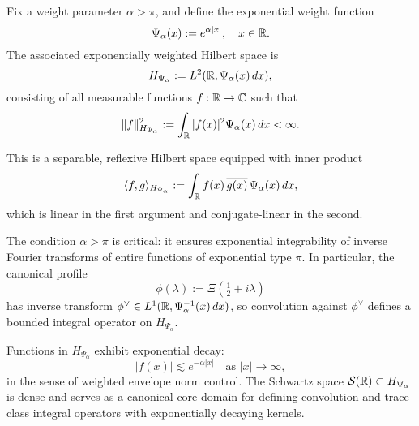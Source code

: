 \begin{definition}
\label{def:weighted_fourier_space}
Fix a weight parameter \( \alpha > \pi \), and define the exponential weight function
\[
\Psi_\alpha(x) := e^{\alpha |x|}, \quad x \in \mathbb{R}.
\]
The associated exponentially weighted Hilbert space is
\[
H_{\Psi_\alpha} := L^2(\mathbb{R}, \Psi_\alpha(x)\, dx),
\]
consisting of all measurable functions \( f : \mathbb{R} \to \mathbb{C} \) such that
\[
\|f\|_{H_{\Psi_\alpha}}^2 := \int_{\mathbb{R}} |f(x)|^2 \Psi_\alpha(x)\, dx < \infty.
\]

This is a separable, reflexive Hilbert space equipped with inner product
\[
\langle f, g \rangle_{H_{\Psi_\alpha}} := \int_{\mathbb{R}} f(x)\, \overline{g(x)}\, \Psi_\alpha(x)\, dx,
\]
which is linear in the first argument and conjugate-linear in the second.

\medskip

The condition \( \alpha > \pi \) is critical: it ensures exponential integrability of inverse Fourier transforms of entire functions of exponential type \( \pi \). In particular, the canonical profile
\[
\phi(\lambda) := \Xi\left( \tfrac{1}{2} + i\lambda \right)
\]
has inverse transform \( \phi^\vee \in L^1(\mathbb{R}, \Psi_\alpha^{-1}(x)\, dx) \), so convolution against \( \phi^\vee \) defines a bounded integral operator on \( H_{\Psi_\alpha} \).

\medskip

Functions in \( H_{\Psi_\alpha} \) exhibit exponential decay:
\[
|f(x)| \lesssim e^{-\alpha |x|} \quad \text{as } |x| \to \infty,
\]
in the sense of weighted envelope norm control. The Schwartz space \( \mathcal{S}(\mathbb{R}) \subset H_{\Psi_\alpha} \) is dense and serves as a canonical core domain for defining convolution and trace-class integral operators with exponentially decaying kernels.
\end{definition}
